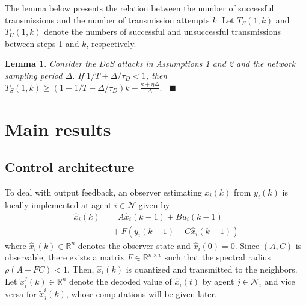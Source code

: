 \documentclass[letterpaper,journal,final,twocolumn]{IEEEtran}
\def\qedp{\hspace*{\fill}~{\tiny $\blacksquare$}}
\newtheorem{itlemma}{Lemma}
\newenvironment{lemma}{\begin{itlemma}\rm}{\end{itlemma}}
\begin{document}
The lemma below presents the relation between the number of successful transmissions and the number of transmission attempts $k$. Let $T_S(1,k)$ and $T_U(1,k)$ denote the numbers of successful and unsuccessful transmissions between steps 1 and $k$, respectively. 

\begin{lemma} \label{Lemma T} 
	\cite{feng2020tac} Consider the DoS attacks in Assumptions 1 and 2 and the network sampling period $\Delta$. If 
	$1/T+ \Delta /\tau_D <1$, then 
	$
	T_S(1, k)
	\ge  \left(1- 1/T - \Delta/\tau_D \right) k   - \frac{\kappa+\eta\Delta}{\Delta}.  
	$ \qedp
\end{lemma}


\vspace{-2mm}
\section{Main results}
\vspace{-1mm}

\subsection{Control architecture}
\vspace{-1mm}
To deal with output feedback, an observer estimating $ x_i (k)$ from $y_i(k)$ is locally implemented at agent $i \in \mathcal N$ given by
\begin{align}\label{local observer}
\hat x_i(k)&=A \hat x_i(k-1)  + B u_i(k-1)  \nonumber\\
&\,\,\,+ F(y_i(k-1)-C \hat x_i (k-1))
\end{align}
where $\hat x_i(k) \in \mathbb{R} ^ n $ denotes the observer state and $\hat x_i(0)=0$.
Since $(A,C)$ is observable, there exists a matrix $F\in \mathbb R ^{n\times v}$ such that the spectral radius $\rho(A-FC)<1$.   
Then, $\hat x_i(k)$ is quantized and transmitted to the neighbors. Let $\tilde x _ i ^ j(k) \in \mathbb{R} ^ n $ denote the decoded value of $\hat x_i(t)$ by agent $j \in \mathcal N_i$ and vice versa for $\tilde x _ j ^ i(k)$, whose computations will be given later. 
\end{document}
